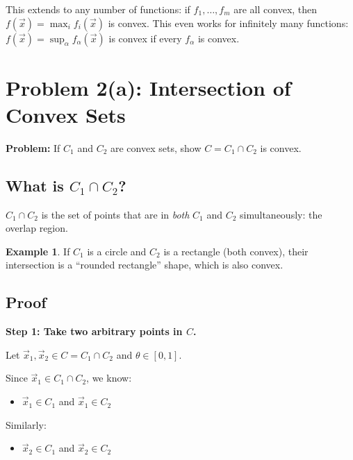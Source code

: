 \documentclass[10pt]{article}
\theoremstyle{definition}
\newtheorem{example}{Example}
\theoremstyle{plain}
\begin{document}
\begin{tcolorbox}[colframe=black!50, title={\small Generalization}]
This extends to any number of functions: if $f_1, \ldots, f_m$ are all convex, then $f(\vec{x}) = \max_i f_i(\vec{x})$ is convex. This even works for infinitely many functions: $f(\vec{x}) = \sup_{\alpha} f_\alpha(\vec{x})$ is convex if every $f_\alpha$ is convex.
\end{tcolorbox}

\section{Problem 2(a): Intersection of Convex Sets}

\textbf{Problem:} If $C_1$ and $C_2$ are convex sets, show $C = C_1 \cap C_2$ is convex.

\subsection{What is $C_1 \cap C_2$?}

$C_1 \cap C_2$ is the set of points that are in \emph{both} $C_1$ and $C_2$ simultaneously: the overlap region.

\begin{example}
If $C_1$ is a circle and $C_2$ is a rectangle (both convex), their intersection is a ``rounded rectangle'' shape, which is also convex.
\end{example}

\subsection{Proof}

\textbf{Step 1: Take two arbitrary points in $C$.}

Let $\vec{x}_1, \vec{x}_2 \in C = C_1 \cap C_2$ and $\theta \in [0,1]$.

Since $\vec{x}_1 \in C_1 \cap C_2$, we know:
\begin{itemize}
    \item $\vec{x}_1 \in C_1$ \quad and \quad $\vec{x}_1 \in C_2$
\end{itemize}
Similarly:
\begin{itemize}
    \item $\vec{x}_2 \in C_1$ \quad and \quad $\vec{x}_2 \in C_2$
\end{itemize}
\end{document}
